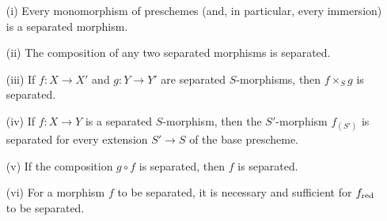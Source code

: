 \begin{proposition}[5.5.1]
\label{1.5.5.1}
\medskip\noindent
\begin{enumerate}
  \item[{\rm(i)}] Every monomorphism of preschemes (and, in particular, every immersion) is a separated morphism.
  \item[{\rm(ii)}] The composition of any two separated morphisms is separated.
  \item[{\rm(iii)}] If $f:X\to X'$ and $g:Y\to Y'$ are separated $S$-morphisms, then $f\times_S g$ is separated.
  \item[{\rm(iv)}] If $f:X\to Y$ is a separated $S$-morphism, then the $S'$-morphism $f_{(S')}$ is separated for every extension $S'\to S$ of the base prescheme.
  \item[{\rm(v)}] If the composition $g\circ f$ is separated, then $f$ is separated.
  \item[{\rm(vi)}] For a morphism $f$ to be separated, it is necessary and sufficient for $f_{\mathrm{red}}$  to be separated.
\end{enumerate}
\end{proposition}

